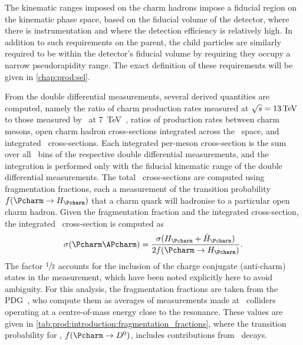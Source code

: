 The kinematic ranges imposed on the charm hadrons impose a fiducial region on 
the kinematic phase space, based on the fiducial volume of the detector, where 
there is instrumentation and where the detection efficiency is relatively high.
In addition to such requirements on the parent, the child particles are 
similarly required to be within the detector's fiducial volume by requiring 
they occupy a narrow pseudorapidity range.
The exact definition of these requirements will be given in 
\cref{chap:prod:sel}.

\begin{table}
  \centering
  \caption{%
      Branching ratios for the different decay 
      modes~\cite{PDG2014,Alexander:2008aa}.
      The \DspTophipi\ branching fraction includes the branching fraction of 
      \phiToKK\@.
  }
  \label{tab:prod:introduction:branching_ratios}
  
\end{table}

From the double differential measurements, several derived quantities are 
computed, namely the ratio of charm production rates measured at $\sqrts = 
\SI{13}{\TeV}$ to those measured by \lhcb\ at 
\SI{7}{\TeV}~\cite{LHCb-PAPER-2012-041}, ratios of production rates between 
charm mesons, open charm hadron cross-sections integrated across the \pTy\ 
space, and integrated \ccbar\ cross-sections.
Each integrated per-meson cross-section is the sum over all \pTy\ bins of the 
respective double differential measurements, and the integration is performed 
only with the fiducial kinematic range of the double differential measurements.
The total \ccbar\ cross-sections are computed using fragmentation fractions, 
each a measurement of the transition probability $f(\cToHc)$ that a charm quark 
will hadronise to a particular open charm hadron.
Given the fragmentation fraction and the integrated cross-section, the 
integrated \ccbar\ cross-section is computed as
\begin{equation}
  \xsec{(\ccbar)} = \frac{\xsec(\PHc + \APHc)}{2f(\cToHc)}.
  \label{eqn:prod:introduction:ccbar_cross_section}
\end{equation}
The factor $\sfrac{1}{2}$ accounts for the inclusion of the charge conjugate 
(anti-charm) states in the measurement, which have been noted explicitly here 
to avoid ambiguity.
For this analysis, the fragmentation fractions are taken from the 
\ac{PDG}~\cite{PDG2008}, who compute them as averages of measurements made at 
\epem\ colliders operating at a centre-of-mass energy close to the 
\PUpsilonFourS resonance.
These values are given in \cref{tab:prod:introduction:fragmentation_fractions}, 
where the transition probability for \PDzero, $f(\decay{\Pcharm}{\PDzero})$, 
includes contributions from \DstToDzpi\ decays.

